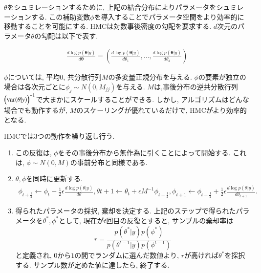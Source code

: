 \documentclass[a4j,11pt]{jarticle}
\begin{document}
$\theta$をシュミレーションするために, 上記の結合分布によりパラメータをシュミレーションする. この補助変数$\phi$を導入することでパラメータ空間をより効率的に移動することを可能にする. HMCは対数事後密度の勾配を要求する. $d$次元のパラメータ$\theta$の勾配は以下で表す.

\vspace{-1zh}
\begin{eqnarray*}
\frac{d \log p(\bm \theta|y)}{d \bm \theta} = \left( 
  \frac{d \log p(\bm \theta|y)}{d \theta_1}, \ldots,
  \frac{d \log p(\bm \theta|y)}{d \theta_d} \right)
\end{eqnarray*}

$\phi$については, 平均$0$, 共分散行列$M$の多変量正規分布を与える. $\phi$の要素が独立の場合は各次元ごとに$\phi_j \sim N(0,M_{jj})$を与える. $M$は,事後分布の逆共分散行列 $\Bigl(\mbox{var}(\theta|y)\Bigr)^{-1}$で大まかにスケールすることができる. しかし, アルゴリズムはどんな場合でも動作するが, $M$のスケーリングが優れているだけで, HMCがより効率的となる.

HMCでは3つの動作を繰り返し行う.

\begin{enumerate}

\item{}
この反復は, $\phi$をその事後分布から無作為に引くことによって開始する. これは, $\phi \sim N(0,M)$の事前分布と同様である.

\item{}
$\theta, \phi$を同時に更新する.
\vspace{-0.5zh}
\begin{eqnarray*}
\phi_{t+\frac{1}{2}} \leftarrow \phi_t + \frac{1}{2} \epsilon \frac{d \log p(\theta|y)}{d\theta}, 
\theta{t+1} \leftarrow \theta_t + \epsilon M^{-1}\phi_{t+\frac{1}{2}},
\phi_{t+1} \leftarrow \phi_{t+\frac{1}{2}} + \frac{1}{2} \epsilon \frac{d \log p(\theta|y)}{d\theta_{t+1}}. 
\end{eqnarray*}

\item{}
得られたパラメータの採択, 棄却を決定する. 上記のステップで得られたパラメータを$\theta^*, \phi^*$として,
現在が$t$回目の反復とすると, サンプルの棄却率は
\vspace{-0.5zh}
$$ r = \frac{p(\theta^*|y) p(\phi^*)}{p(\theta^{t-1}|y) p(\phi^{t-1})}$$
と定義され, $0$から$1$の間でランダムに選んだ数値より, $r$が高ければ$\theta^*$を採択する. サンプル数が定めた値に達したら, 終了する.

\end{enumerate}
\end{document}
